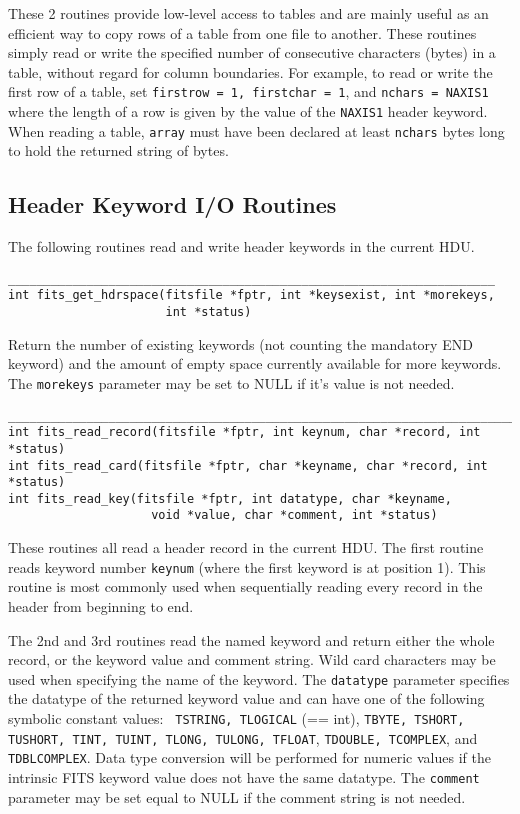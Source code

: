 \documentclass[11pt]{article}
\begin{document}
These 2 routines provide low-level access to tables and are mainly
useful as an efficient way to copy rows of a table from one file to
another.  These routines simply read or write the specified number of
consecutive characters (bytes) in a table, without regard for column
boundaries.  For example, to read or write the first row of a table,
set {\tt firstrow = 1, firstchar = 1}, and {\tt nchars = NAXIS1} where
the length of a row is given by the value of the {\tt NAXIS1} header
keyword.  When reading a table, {\tt array} must have been declared at
least {\tt nchars} bytes long to hold the returned string of bytes.

\newpage
\subsection{Header Keyword I/O Routines}
\nopagebreak
The following routines read and write header keywords in the current HDU.
\nopagebreak

\begin{verbatim}
____________________________________________________________________
int fits_get_hdrspace(fitsfile *fptr, int *keysexist, int *morekeys,
                      int *status)
\end{verbatim}
\nopagebreak
Return the number of existing keywords (not counting the mandatory END
keyword) and the amount of empty space currently available for more
keywords. The {\tt morekeys} parameter may be set to NULL if it's value is
not needed.

\begin{verbatim}
___________________________________________________________________________
int fits_read_record(fitsfile *fptr, int keynum, char *record, int *status)
int fits_read_card(fitsfile *fptr, char *keyname, char *record, int *status)
int fits_read_key(fitsfile *fptr, int datatype, char *keyname,
                    void *value, char *comment, int *status)
\end{verbatim}

These routines all read a header record in the current HDU. The
first routine reads keyword number {\tt keynum} (where the first
keyword is at position 1).  This routine is most commonly used when
sequentially reading every record in the header from beginning to end.

The 2nd and 3rd routines read the named keyword and return either the
whole record, or the keyword value and comment string.   Wild card
characters may be used when specifying the name of the keyword. The
{\tt datatype} parameter specifies the datatype of the returned keyword
value and can have one of the following symbolic constant values:  {\tt
TSTRING, TLOGICAL} (== int), {\tt TBYTE, TSHORT, TUSHORT, TINT, TUINT,
TLONG, TULONG, TFLOAT}, {\tt TDOUBLE, TCOMPLEX}, and {\tt
TDBLCOMPLEX}.  Data type conversion will be performed for numeric
values if the intrinsic FITS keyword value does not have the same
datatype.  The {\tt comment} parameter may be set equal to NULL if the
comment string is not needed.
\end{document}
